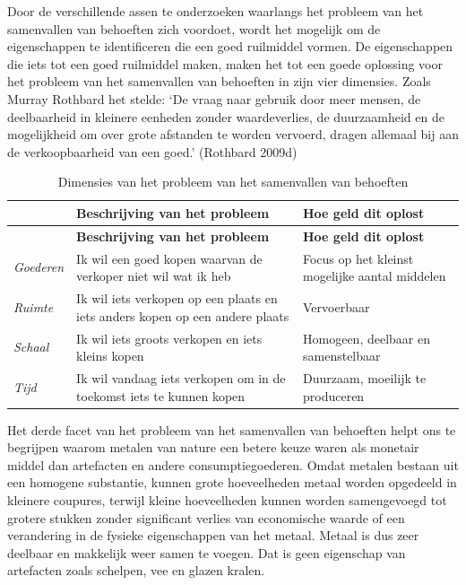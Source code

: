 \documentclass[
  a5paper,
  smalldemyvopaper,11pt,twoside,onecolumn,openright,extrafontsizes,
hidelinks]{memoir}
\begin{document}
Door de verschillende assen te onderzoeken waarlangs het probleem van
het samenvallen van behoeften zich voordoet, wordt het mogelijk om de
eigenschappen te identificeren die een goed ruilmiddel vormen. De
eigenschappen die iets tot een goed ruilmiddel maken, maken het tot een
goede oplossing voor het probleem van het samenvallen van behoeften in
zijn vier dimensies. Zoals Murray Rothbard het stelde: `De vraag naar
gebruik door meer mensen, de deelbaarheid in kleinere eenheden zonder
waardeverlies, de duurzaamheid en de mogelijkheid om over grote
afstanden te worden vervoerd, dragen allemaal bij aan de verkoopbaarheid
van een goed.' (Rothbard 2009d)

\begin{longtable}[]{@{}lll@{}}
\caption{Dimensies van het probleem van het samenvallen van
behoeften}\label{tbl-tab2}\tabularnewline
\toprule\noalign{}
& \textbf{Beschrijving van het probleem} & \textbf{Hoe geld dit
oplost} \\
\midrule\noalign{}
\endfirsthead
\toprule\noalign{}
& \textbf{Beschrijving van het probleem} & \textbf{Hoe geld dit
oplost} \\
\midrule\noalign{}
\endhead
\bottomrule\noalign{}
\endlastfoot
\emph{Goederen} & Ik wil een goed kopen waarvan de verkoper niet wil wat
ik heb & Focus op het kleinst mogelijke aantal middelen \\
\emph{Ruimte} & Ik wil iets verkopen op een plaats en iets anders kopen
op een andere plaats & Vervoerbaar \\
\emph{Schaal} & Ik wil iets groots verkopen en iets kleins kopen &
Homogeen, deelbaar en samenstelbaar \\
\emph{Tijd} & Ik wil vandaag iets verkopen om in de toekomst iets te
kunnen kopen & Duurzaam, moeilijk te produceren \\
\end{longtable}

Het derde facet van het probleem van het samenvallen van behoeften helpt
ons te begrijpen waarom metalen van nature een betere keuze waren als
monetair middel dan artefacten en andere consumptiegoederen. Omdat
metalen bestaan uit een homogene substantie, kunnen grote hoeveelheden
metaal worden opgedeeld in kleinere coupures, terwijl kleine
hoeveelheden kunnen worden samengevoegd tot grotere stukken zonder
significant verlies van economische waarde of een verandering in de
fysieke eigenschappen van het metaal. Metaal is dus zeer deelbaar en
makkelijk weer samen te voegen. Dat is geen eigenschap van artefacten
zoals schelpen, vee en glazen kralen.
\end{document}
